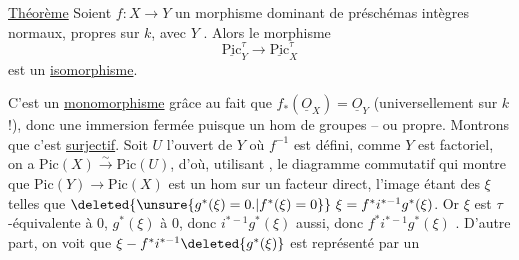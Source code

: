 \uline{Théorème} Soient $f:X\to Y$ un morphisme  dominant
de préschémas intègres normaux,  propres sur $k$,
avec $Y$ . Alors le morphisme
\[
\underline{\mathrm{Pic}}^{\tau}_Y\longrightarrow\underline{\mathrm{Pic}}^{\tau}_X
\]
est un \uline{isomorphisme}.

C'est un \uline{monomorphisme} grâce au fait que
$f_*(\underline{O}_X)=\underline{O}_Y$ (universellement sur $k$ !), donc une
immersion fermée puisque un hom de groupes
-- ou  propre. Montrons que c'est
\uline{surjectif}. Soit $U$ l'ouvert de $Y$ où $f^{-1}$ est
défini, comme $Y$ est factoriel, on a
$\mathrm{Pic}(X)\overset{\sim}{\longrightarrow}\mathrm{Pic}(U)$, d'où, utilisant
, le diagramme commutatif
qui montre que $\mathrm{Pic}(Y)\to\mathrm{Pic}(X)$ est un hom
sur un facteur direct, l'image étant  des
$\xi$ telles que $\deleted{\unsure{g^*(\xi)=0.|f^*(\xi)=0}}\ \xi=f^*i^{*-1}g^*(\xi)$. Or
$\xi$ est  $\tau$-équivalente à $0$,   $g^*(\xi)$
  à $0$, donc $i^{*-1}g^*(\xi)$  aussi,
donc  $f^*i^{*-1}g^*(\xi)$  . D'autre part, on voit que
$\xi-f^*i^{*-1}\deleted{g^*(\xi)}$  est représenté par un
